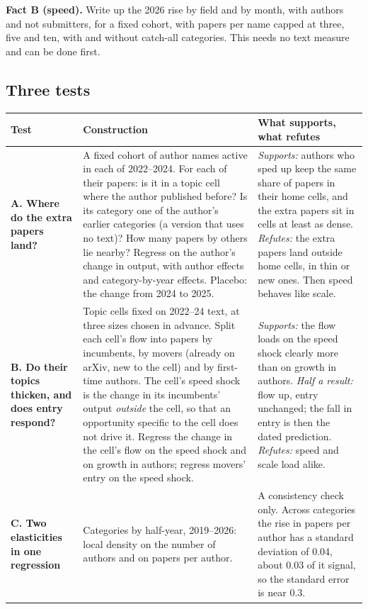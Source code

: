 \textbf{Fact B (speed).} Write up the 2026 rise by field and by month, with authors and not submitters, for a fixed cohort, with papers per name capped at three, five and ten, with and without catch-all categories. This needs no text measure and can be done first.

\subsection{Three tests}

\begin{center}\small
\begin{tabularx}{\textwidth}{@{}P{1.05in}LL@{}}
\toprule
Test & Construction & What supports, what refutes \\
\midrule
\textbf{A. Where do the extra papers land?} & A fixed cohort of author names active in each of 2022--2024. For each of their papers: is it in a topic cell where the author published before? Is its category one of the author's earlier categories (a version that uses no text)? How many papers by others lie nearby? Regress on the author's change in output, with author effects and category-by-year effects. Placebo: the change from 2024 to 2025. & \emph{Supports:} authors who sped up keep the same share of papers in their home cells, and the extra papers sit in cells at least as dense. \emph{Refutes:} the extra papers land outside home cells, in thin or new ones. Then speed behaves like scale. \\
\textbf{B. Do their topics thicken, and does entry respond?} & Topic cells fixed on 2022--24 text, at three sizes chosen in advance. Split each cell's flow into papers by incumbents, by movers (already on arXiv, new to the cell) and by first-time authors. The cell's speed shock is the change in its incumbents' output \emph{outside} the cell, so that an opportunity specific to the cell does not drive it. Regress the change in the cell's flow on the speed shock and on growth in authors; regress movers' entry on the speed shock. & \emph{Supports:} the flow loads on the speed shock clearly more than on growth in authors. \emph{Half a result:} flow up, entry unchanged; the fall in entry is then the dated prediction. \emph{Refutes:} speed and scale load alike. \\
\textbf{C. Two elasticities in one regression} & Categories by half-year, 2019--2026: local density on the number of authors and on papers per author. & A consistency check only. Across categories the rise in papers per author has a standard deviation of 0.04, about 0.03 of it signal, so the standard error is near 0.3. \\
\bottomrule
\end{tabularx}
\end{center}

